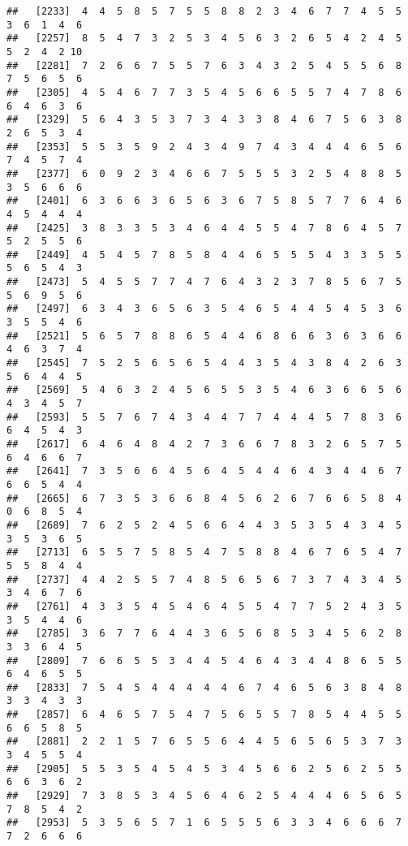 \documentclass[
]{book}
\begin{document}
\begin{verbatim}
##   [2233]  4  4  5  8  5  7  5  5  8  8  2  3  4  6  7  7  4  5  5  3  6  1  4  6
##   [2257]  8  5  4  7  3  2  5  3  4  5  6  3  2  6  5  4  2  4  5  5  2  4  2 10
##   [2281]  7  2  6  6  7  5  5  7  6  3  4  3  2  5  4  5  5  6  8  7  5  6  5  6
##   [2305]  4  5  4  6  7  7  3  5  4  5  6  6  5  5  7  4  7  8  6  6  4  6  3  6
##   [2329]  5  6  4  3  5  3  7  3  4  3  3  8  4  6  7  5  6  3  8  2  6  5  3  4
##   [2353]  5  5  3  5  9  2  4  3  4  9  7  4  3  4  4  4  6  5  6  7  4  5  7  4
##   [2377]  6  0  9  2  3  4  6  6  7  5  5  5  3  2  5  4  8  8  5  3  5  6  6  6
##   [2401]  6  3  6  6  3  6  5  6  3  6  7  5  8  5  7  7  6  4  6  4  5  4  4  4
##   [2425]  3  8  3  3  5  3  4  6  4  4  5  5  4  7  8  6  4  5  7  5  2  5  5  6
##   [2449]  4  5  4  5  7  8  5  8  4  4  6  5  5  5  4  3  3  5  5  5  6  5  4  3
##   [2473]  5  4  5  5  7  7  4  7  6  4  3  2  3  7  8  5  6  7  5  5  6  9  5  6
##   [2497]  6  3  4  3  6  5  6  3  5  4  6  5  4  4  5  4  5  3  6  3  5  5  4  6
##   [2521]  5  6  5  7  8  8  6  5  4  4  6  8  6  6  3  6  3  6  6  4  6  3  7  4
##   [2545]  7  5  2  5  6  5  6  5  4  4  3  5  4  3  8  4  2  6  3  5  6  4  4  5
##   [2569]  5  4  6  3  2  4  5  6  5  5  3  5  4  6  3  6  6  5  6  4  3  4  5  7
##   [2593]  5  5  7  6  7  4  3  4  4  7  7  4  4  4  5  7  8  3  6  6  4  5  4  3
##   [2617]  6  4  6  4  8  4  2  7  3  6  6  7  8  3  2  6  5  7  5  6  4  6  6  7
##   [2641]  7  3  5  6  6  4  5  6  4  5  4  4  6  4  3  4  4  6  7  6  6  5  4  4
##   [2665]  6  7  3  5  3  6  6  8  4  5  6  2  6  7  6  6  5  8  4  0  6  8  5  4
##   [2689]  7  6  2  5  2  4  5  6  6  4  4  3  5  3  5  4  3  4  5  3  5  3  6  5
##   [2713]  6  5  5  7  5  8  5  4  7  5  8  8  4  6  7  6  5  4  7  5  5  8  4  4
##   [2737]  4  4  2  5  5  7  4  8  5  6  5  6  7  3  7  4  3  4  5  3  4  6  7  6
##   [2761]  4  3  3  5  4  5  4  6  4  5  5  4  7  7  5  2  4  3  5  3  5  4  4  6
##   [2785]  3  6  7  7  6  4  4  3  6  5  6  8  5  3  4  5  6  2  8  3  3  6  4  5
##   [2809]  7  6  6  5  5  3  4  4  5  4  6  4  3  4  4  8  6  5  5  6  4  6  5  5
##   [2833]  7  5  4  5  4  4  4  4  4  6  7  4  6  5  6  3  8  4  8  3  3  4  3  3
##   [2857]  6  4  6  5  7  5  4  7  5  6  5  5  7  8  5  4  4  5  5  6  6  5  8  5
##   [2881]  2  2  1  5  7  6  5  5  6  4  4  5  6  5  6  5  3  7  3  3  4  5  5  4
##   [2905]  5  5  3  5  4  5  4  5  3  4  5  6  6  2  5  6  2  5  5  6  6  3  6  2
##   [2929]  7  3  8  5  3  4  5  6  4  6  2  5  4  4  4  6  5  6  5  7  8  5  4  2
##   [2953]  5  3  5  6  5  7  1  6  5  5  5  6  3  3  4  6  6  6  7  7  2  6  6  6

\end{verbatim}
\end{document}
